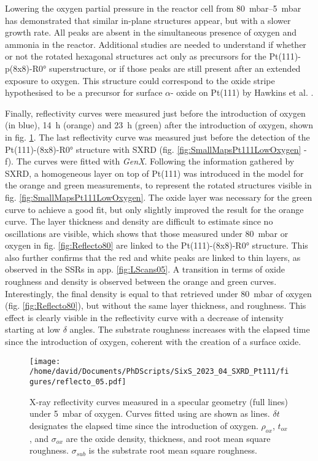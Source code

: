 Lowering the oxygen partial pressure in the reactor cell from \qtyrange{80}{5}{\milli\bar} has demonstrated that similar in-plane structures appear, but with a slower growth rate.
All peaks are absent in the simultaneous presence of oxygen and ammonia in the reactor.
Additional studies are needed to understand if whether or not the rotated hexagonal structures act only as precursors for the Pt(111)-p(8x8)-R\ang{0} superstructure, or if those peaks are still present after an extended exposure to oxygen.
This structure could correspond to the oxide stripe hypothesised to be a precursor for surface $\alpha$- oxide on Pt(111) by Hawkins et al. \parencite*{Hawkins2009}.

Finally, reflectivity curves were measured just before the introduction of oxygen (in blue), \qty{14}{\hour} (orange) and \qty{23}{\hour} (green) after the introduction of oxygen, shown in fig. \ref{fig:Reflecto5}.
The last reflectivity curve was measured just before the detection of the Pt(111)-(8x8)-R\ang{0} structure with SXRD (fig. \ref{fig:SmallMapsPt111LowOxygen} - f).
The curves were fitted with \textit{GenX}.
Following the information gathered by SXRD, a homogeneous layer on top of Pt(111) was introduced in the model for the orange and green measurements, to represent the rotated structures visible in fig. \ref{fig:SmallMapsPt111LowOxygen}.
The oxide layer was necessary for the green curve to achieve a good fit, but only slightly improved the result for the orange curve.
The layer thickness and density are difficult to estimate since no oscillations are visible, which shows that those measured under \qty{80}{\milli\bar} or oxygen in fig. \ref{fig:Reflecto80} are linked to the Pt(111)-(8x8)-R\ang{0} structure.
This also further confirms that the red and white peaks are linked to thin layers, as observed in the SSRs in app. \ref{fig:LScans05}.
A transition in terms of oxide roughness and density is observed between the orange and green curves.
Interestingly, the final density is equal to that retrieved under \qty{80}{\milli\bar} of oxygen (fig. \ref{fig:Reflecto80}), but without the same layer thickness, and roughness.
This effect is clearly visible in the reflectivity curve with a decrease of intensity starting at low $\delta$ angles.
The substrate roughness increases with the elapsed time since the introduction of oxygen, coherent with the creation of a surface oxide.

\begin{figure}[!htb]
    \centering
    \texttt{[image: /home/david/Documents/PhDScripts/SixS\_2023\_04\_SXRD\_Pt111/figures/reflecto\_05.pdf]}
    \caption{
    	X-ray reflectivity curves measured in a specular geometry (full lines) under \qty{5}{\milli\bar} of oxygen.
        Curves fitted using  are shown as lines.
        $\delta t$ designates the elapsed time since the introduction of oxygen.
        $\rho_{ox}$, $t_{ox}$, and $\sigma_{ox}$ are the oxide density, thickness, and root mean square roughness.
        $\sigma_{sub}$ is the substrate root mean square roughness.
    }
    \label{fig:Reflecto5}
\end{figure}

